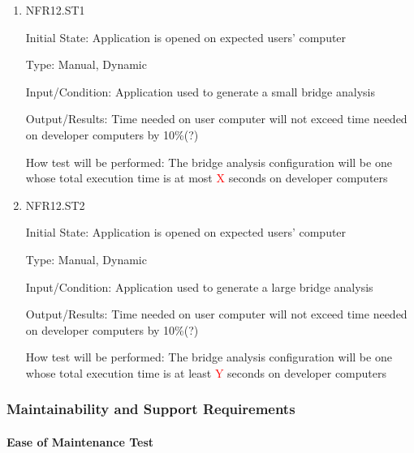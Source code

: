\documentclass[12pt, titlepage]{article}
\begin{document}
\begin{enumerate}

\item{NFR12.ST1\\}

Initial State: Application is opened on expected users' computer

Type: Manual, Dynamic

Input/Condition: Application used to generate a small bridge analysis

Output/Results: Time needed on user computer will not exceed time needed on developer computers by 10\%(?)

How test will be performed: The bridge analysis configuration will be one whose total execution time is at most \textcolor{red}{X} seconds on developer computers

\item{NFR12.ST2\\}

Initial State: Application is opened on expected users' computer

Type: Manual, Dynamic

Input/Condition: Application used to generate a large bridge analysis

Output/Results: Time needed on user computer will not exceed time needed on developer computers by 10\%(?)

How test will be performed: The bridge analysis configuration will be one whose total execution time is at least \textcolor{red}{Y} seconds on developer computers

\end{enumerate}

\subsubsection{Maintainability and Support Requirements}
		
\paragraph{Ease of Maintenance Test}
\end{document}
